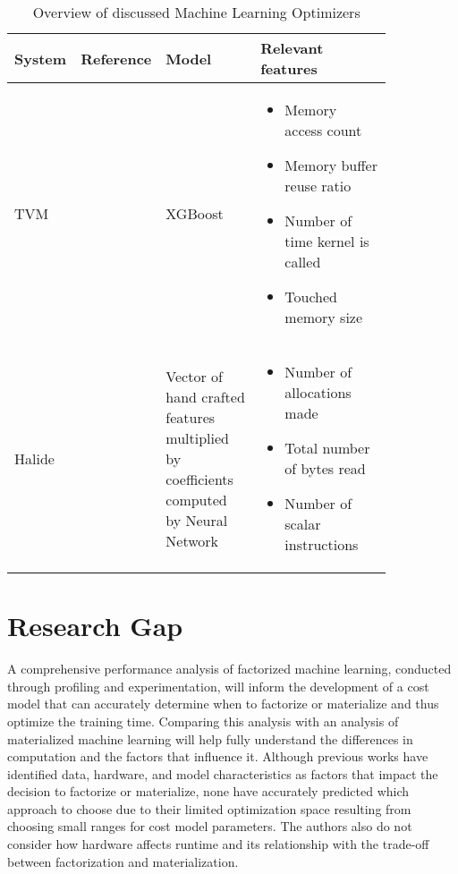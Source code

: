 \begin{table}[ht]
\centering
\begin{tabular}{p{0.15\linewidth}p{0.09\linewidth}p{0.25\linewidth}p{0.35\linewidth}}
\toprule
System     & Reference & Model & Relevant features                                                                                                                                        \\ \midrule \midrule

TVM        & \cite{tvm}          & XGBoost     & \begin{itemize}[noitemsep,topsep=0pt,leftmargin=0.3cm] \item Memory access count \item Memory buffer reuse ratio \item Number of time kernel is called \item Touched memory size \end{itemize}   \\ \midrule
Halide     &  \cite{halide_cost_model} & Vector of hand crafted features multiplied by coefficients computed by Neural Network      & \begin{itemize}[noitemsep,topsep=0pt,leftmargin=0.3cm] \item Number of allocations made \item Total number of bytes read \item Number of scalar instructions \end{itemize}                                                                               \\ \bottomrule
\end{tabular}
\caption{Overview of discussed Machine Learning Optimizers}
\label{tab:optimizer_overview}
\end{table}

\section{Research Gap}
A comprehensive performance analysis of factorized machine learning, conducted through profiling and experimentation, will inform the development of a cost model that can accurately determine when to factorize or materialize and thus optimize the training time. Comparing this analysis with an analysis of materialized machine learning will help fully understand the differences in computation and the factors that influence it. Although previous works have identified data, hardware, and model characteristics as factors that impact the decision to factorize or materialize, none have accurately predicted which approach to choose due to their limited optimization space resulting from choosing small ranges for cost model parameters. The authors also do not consider how hardware affects runtime and its relationship with the trade-off between factorization and materialization.